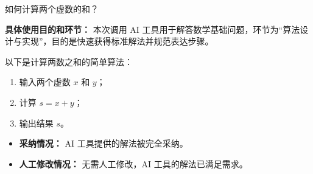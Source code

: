 \begin{block}[colback=orange!10, colframe=orange!60, title={\textcolor{black}{用户提问}}]
如何计算两个虚数的和？
\vspace{0.5em}
\begin{flushright}
    \scriptsize
    \begin{flushleft}
        \textbf{具体使用目的和环节：} 本次调用 AI 工具用于解答数学基础问题，环节为“算法设计与实现”，目的是快速获得标准解法并规范表达步骤。
    \end{flushleft}
\end{flushright}
\end{block}


\begin{GeminiBlock}
以下是计算两数之和的简单算法：
\begin{enumerate}
    \item 输入两个虚数 $x$ 和 $y$；
    \item 计算 $s = x + y$；
    \item 输出结果 $s$。
\end{enumerate}
\end{GeminiBlock}

\begin{block}[colback=green!10, colframe=green!50, title={\textcolor{black}{采纳和人工修改情况}}]
\begin{itemize}
    \item \textbf{采纳情况：} AI 工具提供的解法被完全采纳。
    \item \textbf{人工修改情况：} 无需人工修改，AI 工具的解法已满足需求。
\end{itemize}
\end{block}
